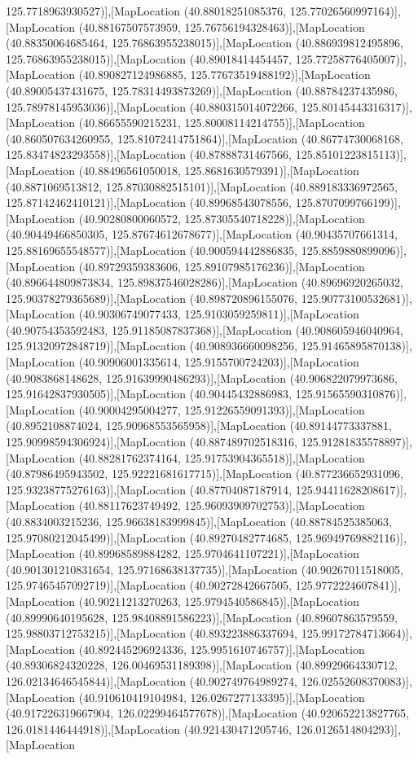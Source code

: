 125.7718963930527)],[MapLocation (40.88018251085376, 125.77026560997164)],[MapLocation (40.88167507573959, 125.76756194328463)],[MapLocation (40.88350064685464, 125.76863955238015)],[MapLocation (40.886939812495896, 125.76863955238015)],[MapLocation (40.89018414454457, 125.77258776405007)],[MapLocation (40.890827124986885, 125.77673519488192)],[MapLocation (40.89005437431675, 125.78314493873269)],[MapLocation (40.88784237435986, 125.78978145953036)],[MapLocation (40.880315014072266, 125.80145443316317)],[MapLocation (40.86655590215231, 125.80008114214755)],[MapLocation (40.860507634260955, 125.81072414751864)],[MapLocation (40.86774730068168, 125.83474823293558)],[MapLocation (40.87888731467566, 125.85101223815113)],[MapLocation (40.88496561050018, 125.8681630579391)],[MapLocation (40.8871069513812, 125.87030882515101)],[MapLocation (40.889183336972565, 125.87142462410121)],[MapLocation (40.89968543078556, 125.8707099766199)],[MapLocation (40.90280800060572, 125.87305540718228)],[MapLocation (40.90449466850305, 125.87674612678677)],[MapLocation (40.90435707661314, 125.88169655548577)],[MapLocation (40.900594442886835, 125.8859880899096)],[MapLocation (40.89729359383606, 125.89107985176236)],[MapLocation (40.896644809873834, 125.89837546028286)],[MapLocation (40.89696920265032, 125.90378279365689)],[MapLocation (40.898720896155076, 125.90773100532681)],[MapLocation (40.90306749077433, 125.9103059259811)],[MapLocation (40.90754353592483, 125.91185087837368)],[MapLocation (40.908605946040964, 125.91320972848719)],[MapLocation (40.908936660098256, 125.91465895870138)],[MapLocation (40.90906001335614, 125.9155700724203)],[MapLocation (40.9083868148628, 125.91639990486293)],[MapLocation (40.906822079973686, 125.91642837930505)],[MapLocation (40.90445432886983, 125.91565590310876)],[MapLocation (40.90004295004277, 125.91226559091393)],[MapLocation (40.8952108874024, 125.90968553565958)],[MapLocation (40.89144773337881, 125.90998594306924)],[MapLocation (40.887489702518316, 125.91281835578897)],[MapLocation (40.88281762374164, 125.91753904365518)],[MapLocation (40.87986495943502, 125.92221681617715)],[MapLocation (40.877236652931096, 125.93238775276163)],[MapLocation (40.87704087187914, 125.94411628208617)],[MapLocation (40.88117623749492, 125.96093909702753)],[MapLocation (40.8834003215236, 125.96638183999845)],[MapLocation (40.88784525385063, 125.97080212045499)],[MapLocation (40.89270482774685, 125.96949769882116)],[MapLocation (40.89968589884282, 125.9704641107221)],[MapLocation (40.901301210831654, 125.97168638137735)],[MapLocation (40.90267011518005, 125.97465457092719)],[MapLocation (40.90272842667505, 125.9772224607841)],[MapLocation (40.90211213270263, 125.9794540586845)],[MapLocation (40.89990640195628, 125.98408891586223)],[MapLocation (40.89607863579559, 125.98803712753215)],[MapLocation (40.893223886337694, 125.99172784713664)],[MapLocation (40.892445296924336, 125.9951610746757)],[MapLocation (40.89306824320228, 126.00469531189398)],[MapLocation (40.89929664330712, 126.02134646545844)],[MapLocation (40.902749764989274, 126.02552608370083)],[MapLocation (40.910610419104984, 126.0267277133395)],[MapLocation (40.917226319667904, 126.02299464577678)],[MapLocation (40.920652213827765, 126.0181446444918)],[MapLocation (40.921430471205746, 126.0126514804293)],[MapLocation 